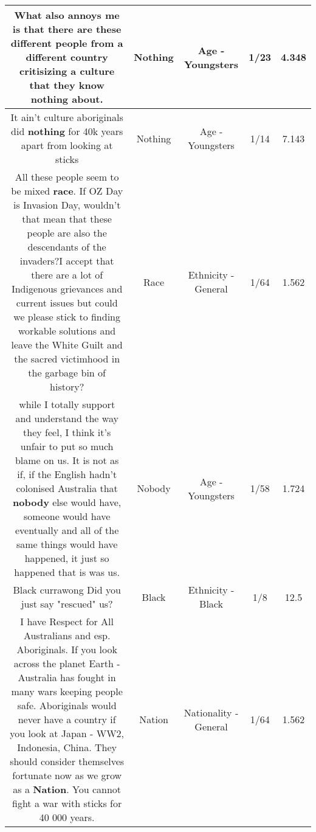 \documentclass[11pt]{article}
\newlength\mylength
\begin{document}
\begin{center}
\begin{longtable}{|C{.65\mylength}|C{.30\mylength}|C{.12\mylength}|C{.12\mylength}|C{.12\mylength}|}
  \small What also annoys me is that there are these different people from a different country critisizing a culture that they know \textbf{nothing} about.\normalsize   & Nothing & Age - Youngsters & 1/23 & 4.348 \\  \hline
  \small It ain't culture aboriginals did \textbf{nothing} for 40k years apart from looking at sticks\normalsize   & Nothing & Age - Youngsters & 1/14 & 7.143 \\  \hline
  \small All these people seem to be mixed \textbf{race}. If OZ Day is Invasion Day, wouldn't that mean that these people are also the descendants of the invaders?I accept that there are a lot of Indigenous grievances and current issues but could we please stick to finding workable solutions and leave the White Guilt and the sacred victimhood in the garbage bin of history?\normalsize   & Race & Ethnicity - General & 1/64 & 1.562 \\  \hline
  \small while I totally support and understand the way they feel, I think it's unfair to put so much blame on us. It is not as if, if the English hadn't colonised Australia that \textbf{nobody} else would have, someone would have eventually and all of the same things would have happened, it just so happened that is was us.\normalsize   & Nobody & Age - Youngsters & 1/58 & 1.724 \\  \hline
  \small Black currawong Did you just say "rescued" us?\normalsize   & Black & Ethnicity - Black & 1/8 & 12.5 \\  \hline
  \small I have Respect for All Australians and esp. Aboriginals. If you look across the planet Earth - Australia has fought in many wars keeping people safe. Aboriginals would never have a country if you look at Japan - WW2, Indonesia, China. They should consider themselves fortunate now as we grow as a \textbf{Nation}. You cannot fight a war with sticks for 40 000 years.\normalsize   & Nation & Nationality - General & 1/64 & 1.562 \\  \hline

\end{longtable}
\end{center}
\end{document}
